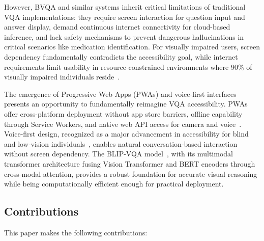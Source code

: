 \documentclass[conference]{IEEEtran}
\begin{document}
However, BVQA and similar systems inherit critical limitations of traditional VQA implementations: they require screen interaction for question input and answer display, demand continuous internet connectivity for cloud-based inference, and lack safety mechanisms to prevent dangerous hallucinations in critical scenarios like medication identification. For visually impaired users, screen dependency fundamentally contradicts the accessibility goal, while internet requirements limit usability in resource-constrained environments where 90\% of visually impaired individuals reside~\cite{who_2023}.

The emergence of Progressive Web Apps (PWAs) and voice-first interfaces presents an opportunity to fundamentally reimagine VQA accessibility. PWAs offer cross-platform deployment without app store barriers, offline capability through Service Workers, and native web API access for camera and voice~\cite{pwa_accessibility_2024}. Voice-first design, recognized as a major advancement in accessibility for blind and low-vision individuals~\cite{voice_first_2024}, enables natural conversation-based interaction without screen dependency. The BLIP-VQA model~\cite{blip_2022}, with its multimodal transformer architecture fusing Vision Transformer and BERT encoders through cross-modal attention, provides a robust foundation for accurate visual reasoning while being computationally efficient enough for practical deployment.

\subsection{Contributions}

This paper makes the following contributions:
\end{document}
